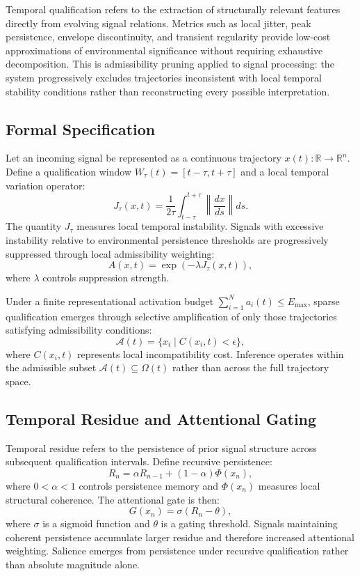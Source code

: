 Temporal qualification refers to the extraction of structurally relevant features
directly from evolving signal relations. Metrics such as local jitter, peak
persistence, envelope discontinuity, and transient regularity provide low-cost
approximations of environmental significance without requiring exhaustive
decomposition. This is admissibility pruning applied to signal processing: the
system progressively excludes trajectories inconsistent with local temporal
stability conditions rather than reconstructing every possible interpretation.

\subsection{Formal Specification}

Let an incoming signal be represented as a continuous trajectory
$x(t): \mathbb{R} \to \mathbb{R}^n$. Define a qualification window
$W_\tau(t) = [t-\tau, t+\tau]$ and a local temporal variation operator:
\[
  J_\tau(x,t) = \frac{1}{2\tau}\int_{t-\tau}^{t+\tau}
  \left\|\frac{dx}{ds}\right\| ds.
\]
The quantity $J_\tau$ measures local temporal instability. Signals with excessive
instability relative to environmental persistence thresholds are progressively
suppressed through local admissibility weighting:
\[
  A(x,t) = \exp(-\lambda J_\tau(x,t)),
\]
where $\lambda$ controls suppression strength.

Under a finite representational activation budget $\sum_{i=1}^N a_i(t) \leq
E_{\max}$, sparse qualification emerges through selective amplification of only
those trajectories satisfying admissibility conditions:
\[
  \mathcal{A}(t) = \bigl\{x_i \mid C(x_i,t) < \epsilon\bigr\},
\]
where $C(x_i,t)$ represents local incompatibility cost. Inference operates within
the admissible subset $\mathcal{A}(t) \subseteq \Omega(t)$ rather than across
the full trajectory space.

\subsection{Temporal Residue and Attentional Gating}

Temporal residue refers to the persistence of prior signal structure across
subsequent qualification intervals. Define recursive persistence:
\[
  R_n = \alpha R_{n-1} + (1-\alpha)\Phi(x_n),
\]
where $0 < \alpha < 1$ controls persistence memory and $\Phi(x_n)$ measures local
structural coherence. The attentional gate is then:
\[
  G(x_n) = \sigma(R_n - \theta),
\]
where $\sigma$ is a sigmoid function and $\theta$ is a gating threshold. Signals
maintaining coherent persistence accumulate larger residue and therefore increased
attentional weighting. Salience emerges from persistence under recursive
qualification rather than absolute magnitude alone.


